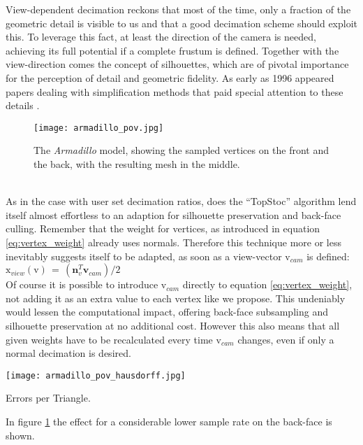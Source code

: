View-dependent decimation reckons that most of the time, only a fraction of the geometric detail is visible to us and that a good decimation scheme should exploit this.  
To leverage this fact, at least the direction of the camera is needed, achieving its full potential if a complete frustum is defined.
Together with the view-direction comes the concept of silhouettes, which are of pivotal importance for the perception of detail and geometric fidelity.
As early as 1996 appeared papers dealing with simplification methods that paid special attention to these details \citep[cf.][in which, not only view-dependencies but also decimation adapting to lighting conditions, gets discussed]{Xia1996}.
\begin{figure}[ht]
\centering
\texttt{[image: armadillo\_pov.jpg]}
\caption{The \textit{Armadillo} model, showing the sampled vertices on the front and the back, with the resulting mesh in the middle.}
\label{fig:armadillo_pov}
\end{figure}\\
As in the case with user set decimation ratios, does the ``TopStoc'' algorithm lend itself almost effortless to an adaption for silhouette preservation and back-face culling.
Remember that the weight for vertices, as introduced in equation \ref{eq:vertex_weight} already uses normals.
Therefore this technique more or less inevitably suggests itself to be adapted, as soon as a view-vector $\mathrm{v}_{cam}$ is defined: $\mathrm{x}_{view}(\mathrm{v}) \,=\, (\textbf{n}^{T}_{v}\textbf{v}_{cam})/2$\\
Of course it is possible to introduce $\mathrm{v}_{cam}$ directly to equation \ref{eq:vertex_weight}, not adding it as an extra value to each vertex like we propose.
This undeniably would lessen the computational impact, offering back-face subsampling and silhouette preservation at no additional cost.
However this also means that all given weights have to be recalculated every time $\mathrm{v}_{cam}$ changes, even if only a normal decimation is desired.\\
\begin{floatingfigure}[r]{0.31\textwidth}
\center
\texttt{[image: armadillo\_pov\_hausdorff.jpg]}
\caption{Errors per Triangle.}
\label{fig:armadillo_pov_hausdorff}
\end{floatingfigure}
In figure \ref{fig:armadillo_pov} the effect for a considerable lower sample rate on the back-face is shown.
